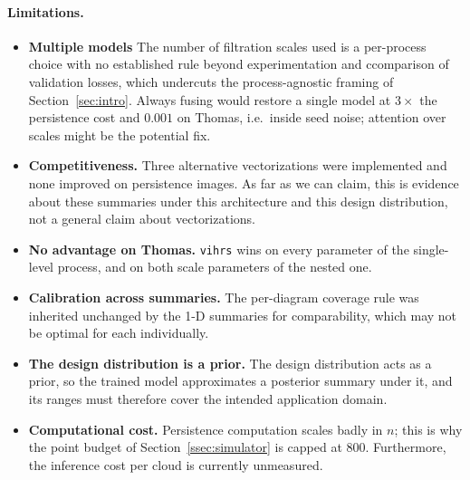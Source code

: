 \documentclass[11pt,a4paper]{article}
\theoremstyle{definitioncolon}
\begin{document}
\paragraph{Limitations.}
\begin{itemize}[leftmargin=*,itemsep=2pt]
    \item \textbf{Multiple models} The number of filtration scales used is a
    per-process choice with no established rule beyond experimentation and ccomparison of validation
    losses, which undercuts the process-agnostic framing of
    Section~\ref{sec:intro}. Always fusing would restore a single model at
    $3\times$ the persistence cost and $0.001$ on Thomas, i.e.\ inside seed
    noise; attention over scales might be the potential fix.
    \item \textbf{Competitiveness.} Three alternative vectorizations were
    implemented and none improved on persistence images. As far as we can claim, this is evidence about
    these summaries under this architecture and
    this design distribution, not a general claim about vectorizations.
    \item \textbf{No advantage on Thomas.} \texttt{vihrs} wins on every
    parameter of the single-level process, and on both scale parameters of the
    nested one.
    \item \textbf{Calibration across summaries.} The per-diagram
    coverage rule was inherited unchanged by the 1-D summaries for
    comparability, which may not be optimal for each individually.
    \item \textbf{The design distribution is a prior.} The design distribution
    acts as a prior, so the trained model approximates a posterior summary
    under it, and its ranges must therefore cover the intended application
    domain.
    \item \textbf{Computational cost.} Persistence computation scales badly in
    $n$; this is why the point budget of Section~\ref{ssec:simulator} is capped at
    800. Furthermore, the inference cost per cloud is currently unmeasured.
\end{itemize}
\end{document}
